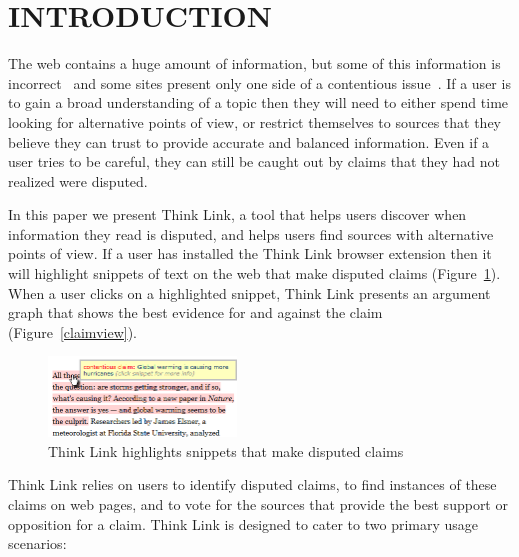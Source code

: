 \documentclass{chi2009}
\newcommand{\todo}[1]{}
\begin{document}




\section{INTRODUCTION}

\todo{update screenshots}

The web contains a huge amount of information, but some of this information is incorrect~\cite{Neumann2003,Resnik1998,Zhou2004} and some sites present only one side of a contentious issue~\cite{Herman2002}. 
If a user is to gain a broad understanding of a topic then they will need to either spend time looking for alternative points of view, or restrict themselves to sources that they believe they can trust to provide accurate and balanced information.
Even if a user tries to be careful, they can still be caught out by claims that they had not realized were disputed.
\todo{word this better}\todo{update all screenshots}

In this paper we present Think Link, a tool that helps users discover when information they read is disputed, and helps users find sources with alternative points of view. 
If a user has installed the Think Link browser extension then it will highlight snippets of text on the web that make disputed claims (Figure~\ref{highlight}). 
When a user clicks on a highlighted snippet, Think Link presents an argument graph that shows the best evidence for and against the claim (Figure~\ref{claimview}). 

\begin{figure}[tb]
	\begin{center}
	\includegraphics[width=5cm]{../screenshots/highlight_crop.png}
	\caption{Think Link highlights snippets that make disputed claims}
	\label{highlight}
	\end{center}
\end{figure}

Think Link relies on users to identify disputed claims, to find instances of these claims on web pages, and to vote for the sources that provide the best support or opposition for a claim. 
Think Link is designed to cater to two primary usage scenarios:
\end{document}
